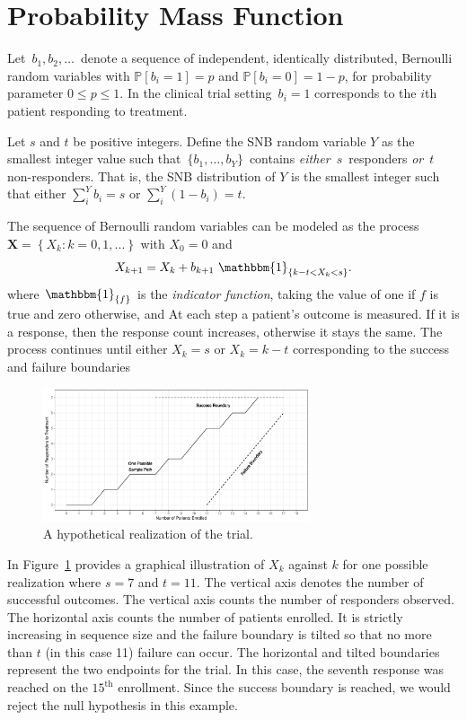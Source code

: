 \documentclass[sii]{ipart}
\begin{document}
\section{Probability Mass Function}
\label{notation.section}

Let $\,b_1, b_2, \ldots \,$ denote a sequence of independent, identically
distributed, Bernoulli random variables with $\mathbb{P}[b_i=1]=p$ and
$\mathbb{P}[b_i = 0] = 1-p$, for
probability parameter $0\leq p \leq 1$. In the clinical trial setting
$\,b_i = 1$ corresponds to the $i$th patient responding to treatment.  

Let $s$ and $t$ be positive integers.  Define the SNB random
variable $Y$ as the smallest
integer value such that $\,\{b_1, \ldots , b_Y\}\,$ contains {\em either}
$\,s\,$ responders {\em or} $\,t\,$ non-responders. That is, the SNB 
distribution of $Y$ is the smallest integer such that either
$\sum_i^Y b_i = s$ or $\sum_i^Y (1-b_i) = t$.

The sequence of Bernoulli random variables can be modeled as the process 
$\mathbf{X} = \left\{X_k : k = 0,1,... \right\}$
with $X_0=0$ and
\begin{equation*} \label{eqn:proc}
X_{k+1} = X_k + b_{k+1} \ \mathbbm{1}_{\{ k-t < X_k < s\}}.
\end{equation*}
where $\mathbbm{1}_{\{f\}}$ is the {\em indicator function}, taking the value 
of one if $f$ is true and zero otherwise, and
At each step a patient's outcome is measured. If it is a response, then
the response count increases, otherwise it stays the same. The process 
continues until either 
$X_k = s$ or $X_k = k-t$ corresponding to the success and failure boundaries

\begin{figure}%
\centering
\includegraphics[width=0.7\textwidth]{KanePlot.pdf}
\caption{
A hypothetical realization of the trial.
}
\label{fig:kane_viz}
\end{figure}

In Figure~\ref{fig:kane_viz} provides a graphical illustration of $X_k$ against
$k$ for one possible realization where $s=7$ and $t=11$. The vertical axis denotes the number of
successful outcomes. The vertical axis counts the number of responders observed.
The horizontal axis counts the number of patients 
enrolled. It is strictly increasing in sequence size and the failure boundary is tilted so that no more than $t$ (in this case 11) failure can occur. The horizontal and tilted boundaries represent the two
endpoints for the trial. In this case, the seventh response was reached on
the $15^{\text{th}}$ enrollment.
Since the success boundary is reached, we would reject the null hypothesis in this example.
\end{document}
